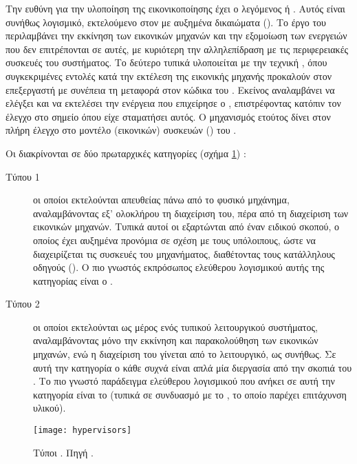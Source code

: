 Την ευθύνη για την υλοποίηση της εικονικοποίησης έχει ο λεγόμενος
 ή . Αυτός είναι συνήθως
λογισμικό, εκτελούμενο στον \host{} με αυξημένα δικαιώματα ().
Το έργο του περιλαμβάνει την εκκίνηση των εικονικών μηχανών και την
εξομοίωση των ενεργειών που δεν επιτρέπονται σε αυτές, με κυριότερη την
αλληλεπίδραση με τις περιφερειακές συσκευές του συστήματος. Το δεύτερο τυπικά
υλοποιείται με την τεχνική , όπου συγκεκριμένες εντολές
κατά την εκτέλεση της εικονικής μηχανής προκαλούν  στον επεξεργαστή
με συνέπεια τη μεταφορά στον κώδικα του . Εκείνος αναλαμβάνει
να ελέγξει και να εκτελέσει την ενέργεια που επιχείρησε ο \guest{},
επιστρέφοντας κατόπιν τον έλεγχο στο σημείο όπου είχε σταματήσει αυτός. Ο
μηχανισμός ετούτος δίνει στον  πλήρη έλεγχο στο μοντέλο
(εικονικών) συσκευών () του 
\cite{wiki:hypervisor}.

Οι  διακρίνονται σε δύο πρωταρχικές κατηγορίες (σχήμα
\ref{fig:hypervisors}) \cite{popek74}:
\begin{description}
    \item[Τύπου 1] οι οποίοι εκτελούνται απευθείας πάνω από το φυσικό μηχάνημα,
          αναλαμβάνοντας εξ' ολοκλήρου τη διαχείριση του, πέρα από τη διαχείριση
          των εικονικών μηχανών. Τυπικά αυτοί οι  εξαρτώνται από
          έναν \guest{} ειδικού σκοπού, ο οποίος έχει αυξημένα προνόμια σε
          σχέση με τους υπόλοιπους, ώστε να διαχειρίζεται τις συσκευές του
          μηχανήματος, διαθέτοντας τους κατάλληλους οδηγούς (). Ο
          πιο γνωστός εκπρόσωπος ελεύθερου λογισμικού αυτής της κατηγορίας είναι
          ο  \cite{xen}.
    \item[Τύπου 2] οι οποίοι εκτελούνται ως μέρος ενός τυπικού λειτουργικού
          συστήματος, αναλαμβάνοντας μόνο την εκκίνηση και παρακολούθηση των
          εικονικών μηχανών, ενώ η διαχείριση του \host{} γίνεται από το
          λειτουργικό, ως συνήθως. Σε αυτή την κατηγορία ο κάθε \guest{} συχνά
          είναι απλά μία διεργασία από την σκοπιά του \host{}. Το πιο γνωστό
          παράδειγμα ελεύθερου λογισμικού που ανήκει σε αυτή την κατηγορία είναι
          το \qemu{} \cite{qemu} (τυπικά σε συνδυασμό με το  \cite{kvm},
          το οποίο παρέχει επιτάχυνση υλικού).
\end{description}

\begin{figure}
    \centering
    \texttt{[image: hypervisors]}
    \caption[Τύποι ]{Τύποι . Πηγή
        .}
    \label{fig:hypervisors}
\end{figure}

